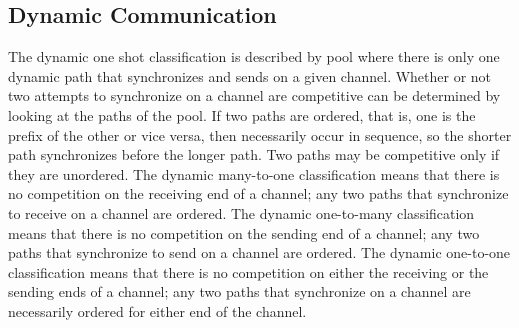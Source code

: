 \documentclass[10pt]{article}
\begin{document}
\subsection{Dynamic Communication}

The dynamic one shot classification is described by pool where there is only one dynamic path
that synchronizes and sends on a given channel. Whether or not two attempts to
synchronize on a channel are competitive can be determined by
looking at the paths of the pool. If two paths are ordered, that is, one is the
prefix of the other or vice versa, then necessarily
occur in sequence, so the shorter path synchronizes before the longer path. Two paths may
be competitive only if they are unordered. The dynamic many-to-one classification means that
there is no competition on the receiving end of a channel; any two paths that synchronize to
receive on a channel are ordered. The dynamic one-to-many classification means that there
is no competition on the sending end of a channel; any two paths that synchronize to
send on a channel are ordered. The dynamic one-to-one classification means that there is no
competition on either the receiving or the sending ends of a channel; any two paths that
synchronize on a channel are necessarily ordered for either end of the channel. 
\end{document}
